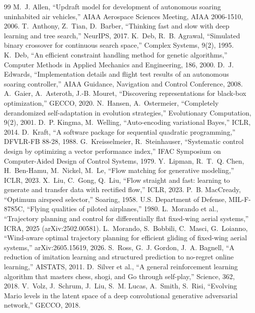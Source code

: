 \documentclass[11pt,a4paper,oneside]{report}
\begin{document}
\begin{thebibliography}{99}
 M.~J. Allen, ``Updraft model for development of autonomous soaring uninhabited air vehicles,'' AIAA Aerospace Sciences Meeting, AIAA 2006-1510, 2006.
 T.~Anthony, Z.~Tian, D.~Barber, ``Thinking fast and slow with deep learning and tree search,'' NeurIPS, 2017.
 K.~Deb, R.~B. Agrawal, ``Simulated binary crossover for continuous search space,'' Complex Systems, 9(2), 1995.
 K.~Deb, ``An efficient constraint handling method for genetic algorithms,'' Computer Methods in Applied Mechanics and Engineering, 186, 2000.
 D.~J. Edwards, ``Implementation details and flight test results of an autonomous soaring controller,'' AIAA Guidance, Navigation and Control Conference, 2008.
 A.~Gaier, A.~Asteroth, J.-B. Mouret, ``Discovering representations for black-box optimization,'' GECCO, 2020.
 N.~Hansen, A.~Ostermeier, ``Completely derandomized self-adaptation in evolution strategies,'' Evolutionary Computation, 9(2), 2001.
 D.~P. Kingma, M.~Welling, ``Auto-encoding variational Bayes,'' ICLR, 2014.
 D.~Kraft, ``A software package for sequential quadratic programming,'' DFVLR-FB 88-28, 1988.
 G.~Kreisselmeier, R.~Steinhauser, ``Systematic control design by optimizing a vector performance index,'' IFAC Symposium on Computer-Aided Design of Control Systems, 1979.
 Y.~Lipman, R.~T.~Q. Chen, H.~Ben-Hamu, M.~Nickel, M.~Le, ``Flow matching for generative modeling,'' ICLR, 2023.
 X.~Liu, C.~Gong, Q.~Liu, ``Flow straight and fast: learning to generate and transfer data with rectified flow,'' ICLR, 2023.
 P.~B. MacCready, ``Optimum airspeed selector,'' Soaring, 1958.
 U.S. Department of Defense, MIL-F-8785C, ``Flying qualities of piloted airplanes,'' 1980.
 L.~Morando et al., ``Trajectory planning and control for differentially flat fixed-wing aerial systems,'' ICRA, 2025 (arXiv:2502.00581).
 L.~Morando, S.~Bobbili, C.~Masci, G.~Loianno, ``Wind-aware optimal trajectory planning for efficient gliding of fixed-wing aerial systems,'' arXiv:2605.15619, 2026.
 S.~Ross, G.~J. Gordon, J.~A. Bagnell, ``A reduction of imitation learning and structured prediction to no-regret online learning,'' AISTATS, 2011.
 D.~Silver et al., ``A general reinforcement learning algorithm that masters chess, shogi, and Go through self-play,'' Science, 362, 2018.
 V.~Volz, J.~Schrum, J.~Liu, S.~M. Lucas, A.~Smith, S.~Risi, ``Evolving Mario levels in the latent space of a deep convolutional generative adversarial network,'' GECCO, 2018.
\end{thebibliography}
\end{document}
